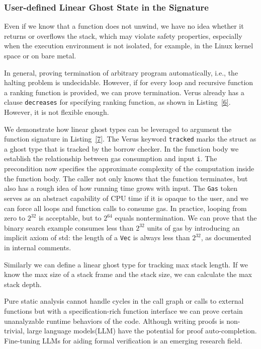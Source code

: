 \documentclass[conference]{IEEEtran}
\begin{document}
\subsubsection{User-defined Linear Ghost State in the Signature}
Even if we know that a function does not unwind, we have no idea whether it returns or overflows the stack, which may violate safety properties, especially when the execution environment is not isolated, for example, in the Linux kernel space or on bare metal.

In general, proving termination of arbitrary program automatically, i.e., the halting problem is undecidable. However, if for every loop and recursive function a ranking function is provided, we can prove termination. Verus already has a clause \texttt{decreases} for specifying ranking function, as shown in Listing~\ref{6}. However, it is not flexible enough. 

We demonstrate how linear ghost types can be leveraged to argument the function signature in Listing~\ref{7}. The Verus keyword \texttt{tracked} marks the struct as a ghost type that is tracked by the borrow checker. In the function body we establish the relationship between gas consumption and input \texttt{i}. The precondition now specifies the approximate complexity of the computation inside the function body. The caller not only knows that the function terminates, but also has a rough idea of how running time grows with input. The \texttt{Gas} token serves as an abstract capability of CPU time if it is opaque to the user, and we can force all loops and function calls to consume gas. In practice, looping from zero to $2^{32}$ is acceptable, but to $2^{64}$ equals nontermination. We can prove that the binary search example consumes less than $2^{32}$ units of gas by introducing an implicit axiom of std: the length of a \texttt{Vec} is always less than $2^{32}$, as documented in internal comments.      

Similarly we can define a linear ghost type for tracking max stack length. If we know the max size of a stack frame and the stack size, we can calculate the max stack depth. 

Pure static analysis cannot handle cycles in the call graph or calls to external functions but with a specification-rich function interface we can prove certain unanalyzable runtime behaviors of the code. Although writing proofs is non-trivial, large language models(LLM) have the potential for proof auto-completion. Fine-tuning LLMs for aiding formal verification\cite{chen2025automatedproofgenerationrust,shefer2025llmsenableverificationmainstream} is an emerging research field.  
\end{document}
